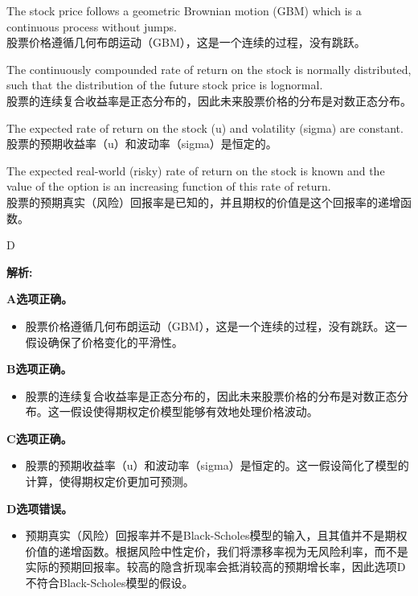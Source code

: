 \documentclass{article}
\newenvironment{explanation}
{\textbf{解析:}\par}
{\par}
\begin{document}
\begin{choices}
    \item The stock price follows a geometric Brownian motion (GBM) which is a continuous process without jumps. \\
    股票价格遵循几何布朗运动（GBM），这是一个连续的过程，没有跳跃。
    \item The continuously compounded rate of return on the stock is normally distributed, such that the distribution of the future stock price is lognormal. \\
    股票的连续复合收益率是正态分布的，因此未来股票价格的分布是对数正态分布。
    \item The expected rate of return on the stock (u) and volatility (sigma) are constant. \\
    股票的预期收益率（u）和波动率（sigma）是恒定的。
    \item The expected real-world (risky) rate of return on the stock is known and the value of the option is an increasing function of this rate of return. \\
    股票的预期真实（风险）回报率是已知的，并且期权的价值是这个回报率的递增函数。
\end{choices}

\begin{correctanswer}
    D
\end{correctanswer}


\begin{explanation}
    \textbf{A选项正确。}
    \begin{itemize}
        \item 股票价格遵循几何布朗运动（GBM），这是一个连续的过程，没有跳跃。这一假设确保了价格变化的平滑性。
    \end{itemize}

    \textbf{B选项正确。}
    \begin{itemize}
        \item 股票的连续复合收益率是正态分布的，因此未来股票价格的分布是对数正态分布。这一假设使得期权定价模型能够有效地处理价格波动。
    \end{itemize}

    \textbf{C选项正确。}
    \begin{itemize}
        \item 股票的预期收益率（u）和波动率（sigma）是恒定的。这一假设简化了模型的计算，使得期权定价更加可预测。
    \end{itemize}

    \textbf{D选项错误。}
    \begin{itemize}
        \item 预期真实（风险）回报率并不是Black-Scholes模型的输入，且其值并不是期权价值的递增函数。根据风险中性定价，我们将漂移率视为无风险利率，而不是实际的预期回报率。较高的隐含折现率会抵消较高的预期增长率，因此选项D不符合Black-Scholes模型的假设。
    \end{itemize}
\end{explanation}
\end{document}
